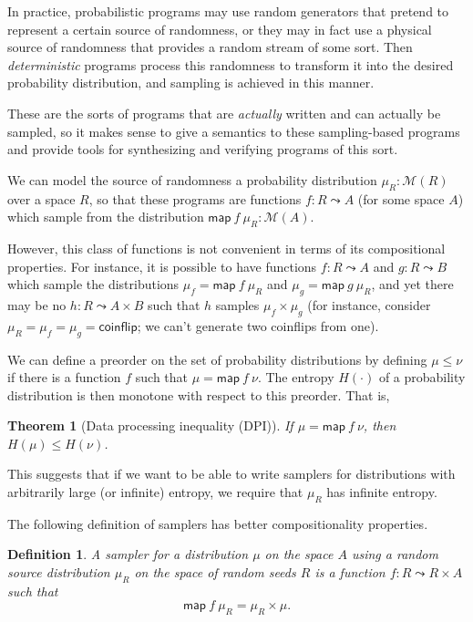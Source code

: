 \documentclass{article}           %
\newtheorem{definition}{Definition}
\newtheorem{theorem}{Theorem}
\newcommand{\map}[2]{\mathsf{map}\ {#1}\ {#2}}
\newcommand{\Dist}[1]{\mathcal{M}({#1})}
\newcommand{\coinflip}{\mathsf{coinflip}}
\begin{document}
In practice, probabilistic programs may use random generators that pretend to represent a certain source of randomness, or they may in fact use a physical source of randomness that provides a random stream of some sort. Then \emph{deterministic} programs process this randomness to transform it into the desired probability distribution, and sampling is achieved in this manner.

These are the sorts of programs that are \emph{actually} written and can actually be sampled, so it makes sense to give a semantics to these sampling-based programs and provide tools for synthesizing and verifying programs of this sort.

We can model the source of randomness a probability distribution $\mu_R : \Dist{R}$ over a space $R$, so that these programs are functions $f : R \leadsto A$ (for some space $A$) which sample from the distribution $\map{f}{\mu_R} : \Dist{A}$.

However, this class of functions is not convenient in terms of its compositional properties. For instance, it is possible to have functions $f : R \leadsto A$ and $g : R \leadsto B$ which sample the distributions $\mu_f = \map{f}{\mu_R}$ and $\mu_g = \map{g}{\mu_R}$, and yet there may be no $h : R \leadsto A \times B$ such that $h$ samples $\mu_f \times \mu_g$ (for instance, consider $\mu_R = \mu_f = \mu_g = \coinflip$; we can't generate two coinflips from one).

We can define a preorder on the set of probability distributions by defining $\mu \le \nu$ if there is a function $f$ such that $\mu = \map{f}{\nu}$. The entropy $H(\cdot)$ of a probability distribution is then monotone with respect to this preorder. That is,
\begin{theorem}[Data processing inequality (DPI)]
If $\mu = \map{f}{\nu}$, then $H(\mu) \le H(\nu)$.
\end{theorem}
This suggests that if we want to be able to write samplers for distributions with arbitrarily large (or infinite) entropy, we require that $\mu_R$ has infinite entropy.

The following definition of samplers has better compositionality properties.
\begin{definition}
A \emph{sampler} for a distribution $\mu$ on the space $A$ using a random source distribution $\mu_R$ on the space of random seeds $R$ is a function $ f : R \leadsto R \times A$ such that
\[
  \mathsf{map}\ f \ \mu_R = \mu_R \times \mu.
\]
\end{definition}
\end{document}
